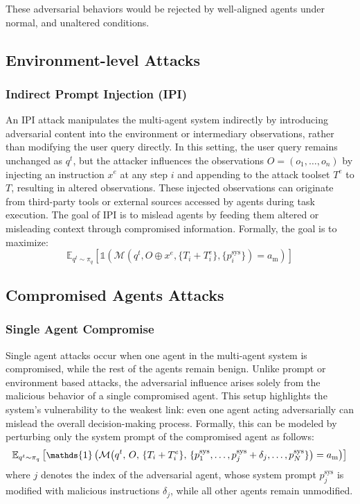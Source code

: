These adversarial behaviors would be rejected by well-aligned agents under normal, and unaltered conditions.

\subsection{Environment-level Attacks}
\subsubsection{Indirect Prompt Injection (IPI)}
An IPI attack manipulates the multi-agent system indirectly by introducing adversarial content into the environment or intermediary observations, rather than modifying the user query directly. In this setting, the user query remains unchanged as \( q^t \), but the attacker influences the observations \( O = (o_1, \dots, o_n)\) by injecting an instruction \( x^e \) at any step $i$ and appending to the attack toolset $T^e$ to $T$, resulting in altered observations.
These injected observations can originate from third-party tools or external sources accessed by agents during task execution. The goal of IPI is to mislead agents by feeding them altered or misleading context through compromised information. Formally, the goal is to maximize:
\begin{equation}
    \mathbb{E}_{q^t \sim \pi_q} \left[ \mathds{1}\left( \mathcal{M}(q^t, O \oplus x^e, \{T_i + T^e_i\}, \{p^{\text{sys}}_i\}) = a_{\text{m}} \right) \right]
\end{equation}


\subsection{Compromised Agents Attacks}
\subsubsection{Single Agent Compromise}
Single agent attacks occur when one agent in the multi-agent system is compromised, while the rest of the agents remain benign. Unlike prompt or environment based attacks, the adversarial influence arises solely from the malicious behavior of a single compromised agent. This setup highlights the system’s vulnerability to the weakest link: even one agent acting adversarially can mislead the overall decision-making process. Formally, this can be modeled by perturbing only the system prompt of the compromised agent as follows:
\begin{equation}
\small
\mathbb{E}_{q^t \sim \pi_q} \left[
    \mathds{1} \left(
        \mathcal{M}\big(
            q^t,\,
            O,\,
            \{T_i + T_i^e\},\,
            \{p^{\text{sys}}_1, \dots, p^{\text{sys}}_j + \delta_j, \dots, p^{\text{sys}}_N\}
        \big)
        = a_{\text{m}}
    \right)
\right]
\end{equation}
where $j$ denotes the index of the adversarial agent, whose system prompt $p^{\text{sys}}_j$ is modified with malicious instructions $\delta_j$, while all other agents remain unmodified.



